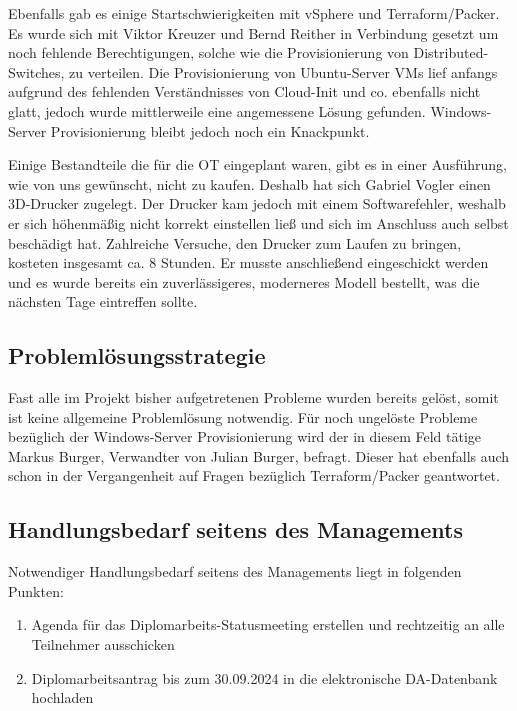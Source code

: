 \documentclass[
	headings=optiontotocandhead,%
	oneside,
	numbers=noenddot,%
	toc=flat, %
	10pt, %
	parskip=full, %
	listof=totoc, %
	listof=flat, %
	numbers=noenddot, %
	bibliography=totoc, %
	a4paper,DIV=14,
]{scrartcl}
\begin{document}
Ebenfalls gab es einige Startschwierigkeiten mit vSphere und Terraform/Packer. Es wurde sich mit Viktor Kreuzer und Bernd Reither in Verbindung gesetzt um noch fehlende Berechtigungen, solche wie die Provisionierung von Distributed-Switches, zu verteilen. Die Provisionierung von Ubuntu-Server VMs lief anfangs aufgrund des fehlenden Verständnisses von Cloud-Init und co. ebenfalls nicht glatt, jedoch wurde mittlerweile eine angemessene Lösung gefunden. Windows-Server Provisionierung bleibt jedoch noch ein Knackpunkt.

Einige Bestandteile die für die OT eingeplant waren, gibt es in einer Ausführung, wie von uns gewünscht, nicht zu kaufen. Deshalb hat sich Gabriel Vogler einen 3D-Drucker zugelegt. Der Drucker kam jedoch mit einem Softwarefehler, weshalb er sich höhenmäßig nicht korrekt einstellen ließ und sich im Anschluss auch selbst beschädigt hat. Zahlreiche Versuche, den Drucker zum Laufen zu bringen, kosteten insgesamt ca. 8 Stunden. Er musste anschließend eingeschickt werden und es wurde bereits ein zuverlässigeres, moderneres Modell bestellt, was die nächsten Tage eintreffen sollte.

\subsection{Problemlösungsstrategie}
Fast alle im Projekt bisher aufgetretenen Probleme wurden bereits gelöst, somit ist keine allgemeine Problemlösung notwendig. Für noch ungelöste Probleme bezüglich der Windows-Server Provisionierung wird der in diesem Feld tätige Markus Burger, Verwandter von Julian Burger, befragt. Dieser hat ebenfalls auch schon in der Vergangenheit auf Fragen bezüglich Terraform/Packer geantwortet.

\subsection{Handlungsbedarf seitens des Managements}
Notwendiger Handlungsbedarf seitens des Managements liegt in folgenden Punkten:

\begin{enumerate}
	\item Agenda für das Diplomarbeits-Statusmeeting erstellen und rechtzeitig an alle Teilnehmer ausschicken
	\item Diplomarbeitsantrag bis zum 30.09.2024 in die elektronische DA-Datenbank hochladen
\end{enumerate}
\end{document}
